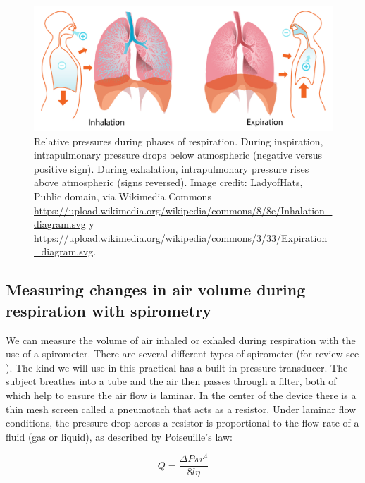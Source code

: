 \documentclass{article}
\begin{document}
\begin{figure}[!htbp]
\centering
\includegraphics[width=0.9\linewidth]{files/EPpXta8zJdzN048lz8AR-4e6135f18f60bd1896e617675a4bb626.png}
\caption[]{Relative pressures during phases of respiration. During inspiration, intrapulmonary pressure drops below atmospheric (negative versus positive sign). During exhalation, intrapulmonary pressure rises above atmospheric (signs reversed). Image credit: LadyofHats, Public domain, via Wikimedia Commons \href{https://upload.wikimedia.org/wikipedia/commons/8/8e/Inhalation\_diagram.svg}{https://upload.wikimedia.org/wikipedia/commons/8/8e/Inhalation\_diagram.svg} y \href{https://upload.wikimedia.org/wikipedia/commons/3/33/Expiration\_diagram.svg}{https://upload.wikimedia.org/wikipedia/commons/3/33/Expiration\_diagram.svg}.}
\label{g7kHmFxL51}
\end{figure}

\subsection{Measuring changes in air volume during respiration with spirometry}

We can measure the volume of air inhaled or exhaled during respiration with the use of a spirometer. There are several different types of spirometer (for review see \citet{Schlegelmilch2011Pulmonary}). The kind we will use in this practical has a built-in pressure transducer. The subject breathes into a tube and the air then passes through a filter, both of which help to ensure the air flow is laminar. In the center of the device there is a thin mesh screen called a pneumotach that acts as a resistor. Under laminar flow conditions, the pressure drop across a resistor is proportional to the flow rate of a fluid (gas or liquid), as described by Poiseuille's law:

\begin{equation}
\label{Ca18hbxv8z}
Q = \frac{\Delta P \pi r^4}{8l\eta}
\end{equation}
\end{document}
